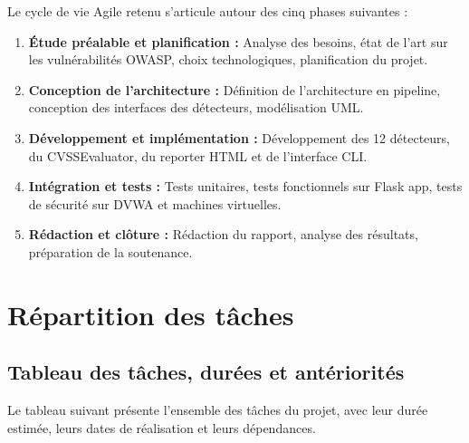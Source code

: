 \documentclass[12pt,a4paper]{report}
\begin{document}
Le cycle de vie Agile retenu s'articule autour des cinq phases suivantes :

\begin{enumerate}
  \item \textbf{Étude préalable et planification :} Analyse des besoins, état de l'art
    sur les vulnérabilités OWASP, choix technologiques, planification du projet.

  \item \textbf{Conception de l'architecture :} Définition de l'architecture en pipeline,
    conception des interfaces des détecteurs, modélisation UML.

  \item \textbf{Développement et implémentation :} Développement des 12 détecteurs,
    du CVSSEvaluator, du reporter HTML et de l'interface CLI.

  \item \textbf{Intégration et tests :} Tests unitaires, tests fonctionnels sur Flask app,
    tests de sécurité sur DVWA et machines virtuelles.

  \item \textbf{Rédaction et clôture :} Rédaction du rapport, analyse des résultats,
    préparation de la soutenance.
\end{enumerate}

\section{Répartition des tâches}

\subsection{Tableau des tâches, durées et antériorités}

Le tableau suivant présente l'ensemble des tâches du projet, avec leur durée estimée,
leurs dates de réalisation et leurs dépendances.
\end{document}
